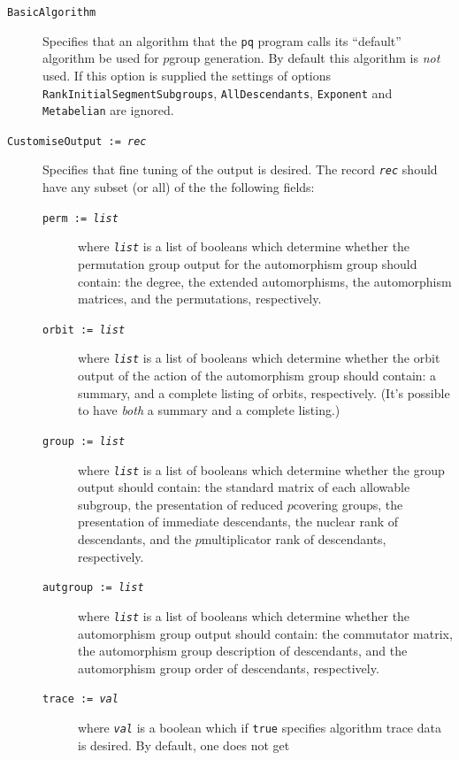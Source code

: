 \documentclass[a4paper,11pt]{report}
\begin{document}
{{\begin{description}
\item[{\texttt{BasicAlgorithm} \label{option BasicAlgorithm}}]  Specifies that an algorithm that the \texttt{pq} program calls its ``default'' algorithm be used for $p$\texttt{}group generation. By default this algorithm is \emph{not} used. If this option is supplied the settings of options \texttt{RankInitialSegmentSubgroups}, \texttt{AllDescendants}, \texttt{Exponent} and \texttt{Metabelian} are ignored. 
\item[{\texttt{CustomiseOutput := \mbox{\texttt{\mdseries\slshape rec}}} \label{option CustomiseOutput}}]  Specifies that fine tuning of the output is desired. The record \mbox{\texttt{\mdseries\slshape rec}} should have any subset (or all) of the the following fields: 
\begin{description}
\item[{\texttt{perm := \mbox{\texttt{\mdseries\slshape list}}}}]  where \mbox{\texttt{\mdseries\slshape list}} is a list of booleans which determine whether the permutation group output for
the automorphism group should contain: the degree, the extended automorphisms,
the automorphism matrices, and the permutations, respectively. 
\item[{\texttt{orbit := \mbox{\texttt{\mdseries\slshape list}}}}]  where \mbox{\texttt{\mdseries\slshape list}} is a list of booleans which determine whether the orbit output of the action
of the automorphism group should contain: a summary, and a complete listing of
orbits, respectively. (It's possible to have \emph{both} a summary and a complete listing.) 
\item[{\texttt{group := \mbox{\texttt{\mdseries\slshape list}}}}]  where \mbox{\texttt{\mdseries\slshape list}} is a list of booleans which determine whether the group output should contain:
the standard matrix of each allowable subgroup, the presentation of reduced $p$\texttt{}covering groups, the presentation of immediate
descendants, the nuclear rank of descendants, and the $p$\texttt{}multiplicator rank of descendants, respectively. 
\item[{\texttt{autgroup := \mbox{\texttt{\mdseries\slshape list}}}}]  where \mbox{\texttt{\mdseries\slshape list}} is a list of booleans which determine whether the automorphism group output
should contain: the commutator matrix, the automorphism group description of
descendants, and the automorphism group order of descendants, respectively. 
\item[{\texttt{trace := \mbox{\texttt{\mdseries\slshape val}}}}]  where \mbox{\texttt{\mdseries\slshape val}} is a boolean which if \texttt{true} specifies algorithm trace data is desired. By default, one does not get

\end{description}
\end{description}}}
\end{document}
